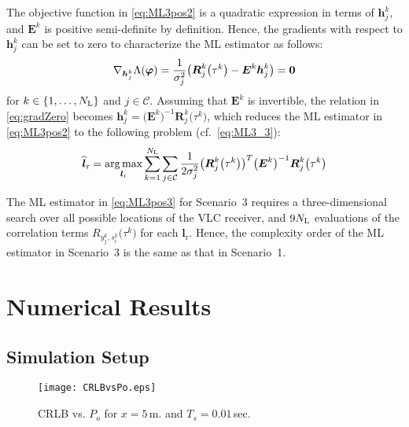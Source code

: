 \documentclass[10pt,twocolumn]{IEEEtran}
\newcommand{\NL}{N_{\rm{L}}}
\newcommand{\bvp}{{\boldsymbol{\varphi}}}
\newcommand{\mtC}{{\mathcal{C}}}
\newcommand{\lr}{{\boldsymbol{l}_{\mathrm{r}}}}
\newcommand{\lrh}{{\widehat{\boldsymbol{l}}_{\mathrm{r}}}}
\newcommand{\hjk}{{\boldsymbol{h}}^{k}_{j}}
\newcommand{\hjkh}{\widehat{{\boldsymbol{h}}}^{k}_{j}}
\newcommand{\Rjk}{{\boldsymbol{R}}^{k}_{j}}
\newcommand{\Ek}{{\boldsymbol{E}}^{k}}
\begin{document}
The objective function in \eqref{eq:ML3pos2} is a quadratic expression in terms of $\hjk$, and $\Ek$ is positive semi-definite by definition. Hence, the gradients with respect to $\hjk$ can be set to zero to characterize the ML estimator as follows:
\begin{gather}\label{eq:gradZero}
\nabla_{\hjk}\Lambda(\bvp)=\frac{1}{\sigma_j^2}
\big(\Rjk\big(\tau^k\big)-\Ek\hjk\big)=\bf{0}
\end{gather}
for $k\in\{1,\ldots,\NL\}$ and $j\in{\mtC}$. Assuming that $\Ek$ is invertible, the relation in \eqref{eq:gradZero} becomes $\hjk=\big(\Ek\big)^{-1}\Rjk\big({\tau}^k\big)$, which reduces the ML estimator in \eqref{eq:ML3pos2} to the following problem (cf.~\eqref{eq:ML3_3}):
\begin{align}\label{eq:ML3pos3}
\lrh
=\underset{\lr}
{\arg\max}\sum_{k=1}^{\NL}\sum_{j\in{\mtC}}\frac{1}{2\sigma_j^2}
\big(\Rjk\big({\tau}^k\big)\big)^T
\big(\Ek\big)^{-1}
\Rjk\big({\tau}^k\big)
\end{align}

The ML estimator in \eqref{eq:ML3pos3} for Scenario~3 requires a three-dimensional search over all possible locations of the VLC receiver, and $9\NL$ evaluations of the correlation terms $R_{y^k_j,s^k_i}\big(\tau^k\big)$ for each $\lr$. Hence, the complexity order of the ML estimator in Scenario~3 is the same as that in Scenario~1.


\section{Numerical Results}\label{sec:Nume}

\subsection{Simulation Setup}\label{sec:NumeSetup}
%

\begin{figure}%
        \centering
        \texttt{[image: CRLBvsPo.eps]}
        \caption{CRLB vs. $P_o$ for $x = 5$\,m. and $T_s = 0.01\,$sec.}
\label{fig:CRLBvsPo}
\end{figure}
\end{document}
